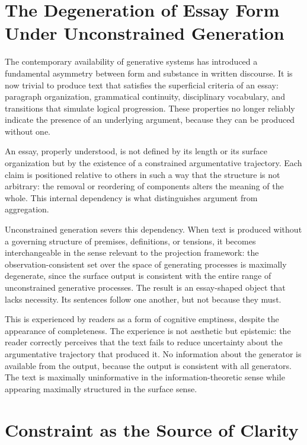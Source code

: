 \documentclass[12pt, oneside]{article}
\theoremstyle{plain}
\theoremstyle{definition}
\theoremstyle{remark}
\begin{document}
\section{The Degeneration of Essay Form Under Unconstrained Generation}

The contemporary availability of generative systems has introduced a fundamental asymmetry
between form and substance in written discourse. It is now trivial to produce text that
satisfies the superficial criteria of an essay: paragraph organization, grammatical
continuity, disciplinary vocabulary, and transitions that simulate logical progression.
These properties no longer reliably indicate the presence of an underlying argument,
because they can be produced without one.

An essay, properly understood, is not defined by its length or its surface organization
but by the existence of a constrained argumentative trajectory. Each claim is positioned
relative to others in such a way that the structure is not arbitrary: the removal or
reordering of components alters the meaning of the whole. This internal dependency is what
distinguishes argument from aggregation.

Unconstrained generation severs this dependency. When text is produced without a governing
structure of premises, definitions, or tensions, it becomes interchangeable in the sense
relevant to the projection framework: the observation-consistent set over the space of
generating processes is maximally degenerate, since the surface output is consistent with
the entire range of unconstrained generative processes. The result is an essay-shaped
object that lacks necessity. Its sentences follow one another, but not because they must.

This is experienced by readers as a form of cognitive emptiness, despite the appearance of
completeness. The experience is not aesthetic but epistemic: the reader correctly perceives
that the text fails to reduce uncertainty about the argumentative trajectory that produced
it. No information about the generator is available from the output, because the output is
consistent with all generators. The text is maximally uninformative in the
information-theoretic sense while appearing maximally structured in the surface sense.

\section{Constraint as the Source of Clarity}
\end{document}
